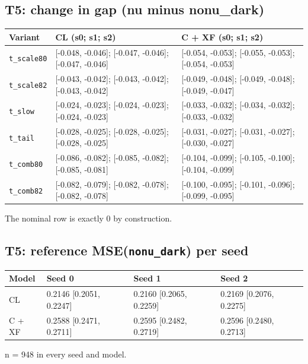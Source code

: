 \documentclass[10pt,a4paper]{article}
\begin{document}
\subsection{T5: change in gap (nu minus nonu\_dark)}
\begin{center}\small
\setlength{\tabcolsep}{3pt}\renewcommand{\arraystretch}{1.15}
\begin{tabularx}{\linewidth}{LLL}
\toprule
\textbf{Variant} & \textbf{CL (s0; s1; s2)} & \textbf{C + XF (s0; s1; s2)} \\
\midrule
\texttt{t\_\allowbreak{}scale80} & [-0.048, -0.046]; [-0.047, -0.046]; [-0.047, -0.046] & [-0.054, -0.053]; [-0.055, -0.053]; [-0.054, -0.053] \\
\texttt{t\_\allowbreak{}scale82} & [-0.043, -0.042]; [-0.043, -0.042]; [-0.043, -0.042] & [-0.049, -0.048]; [-0.049, -0.048]; [-0.049, -0.047] \\
\texttt{t\_\allowbreak{}slow} & [-0.024, -0.023]; [-0.024, -0.023]; [-0.024, -0.023] & [-0.033, -0.032]; [-0.034, -0.032]; [-0.033, -0.032] \\
\texttt{t\_\allowbreak{}tail} & [-0.028, -0.025]; [-0.028, -0.025]; [-0.028, -0.025] & [-0.031, -0.027]; [-0.031, -0.027]; [-0.030, -0.027] \\
\texttt{t\_\allowbreak{}comb80} & [-0.086, -0.082]; [-0.085, -0.082]; [-0.085, -0.081] & [-0.104, -0.099]; [-0.105, -0.100]; [-0.104, -0.099] \\
\texttt{t\_\allowbreak{}comb82} & [-0.082, -0.079]; [-0.082, -0.078]; [-0.082, -0.078] & [-0.100, -0.095]; [-0.101, -0.096]; [-0.099, -0.095] \\
\bottomrule
\end{tabularx}
\end{center}
The nominal row is exactly 0 by construction.

\subsection{T5: reference MSE(\texttt{nonu\_\allowbreak{}dark}) per seed}
\begin{center}\small
\setlength{\tabcolsep}{3pt}\renewcommand{\arraystretch}{1.15}
\begin{tabularx}{\linewidth}{LLLL}
\toprule
\textbf{Model} & \textbf{Seed 0} & \textbf{Seed 1} & \textbf{Seed 2} \\
\midrule
CL & 0.2146 [0.2051, 0.2247] & 0.2160 [0.2065, 0.2259] & 0.2169 [0.2076, 0.2275] \\
C + XF & 0.2588 [0.2471, 0.2711] & 0.2595 [0.2482, 0.2719] & 0.2596 [0.2480, 0.2713] \\
\bottomrule
\end{tabularx}
\end{center}
n = 948 in every seed and model.
\end{document}
